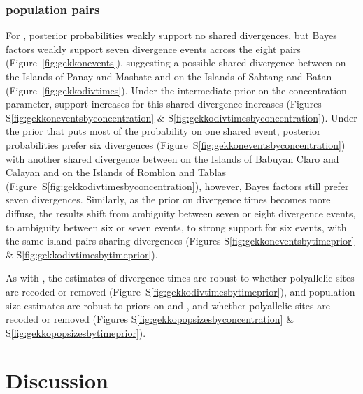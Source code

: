 \ifembed{

}{}

\ifembed{

}{}

\subsubsection{ population pairs}
For , posterior probabilities weakly support no shared divergences,
but Bayes factors weakly support seven divergence events across the eight pairs
(Figure~\ref{fig:gekkonevents}),
suggesting a possible shared divergence between
 on the Islands of Panay and Masbate
and
 on the Islands of Sabtang and Batan
(Figure~\ref{fig:gekkodivtimes}).
Under the intermediate prior on the concentration parameter, support
increases for this shared divergence increases 
(Figures
S\ref{fig:gekkoneventsbyconcentration}
\&
S\ref{fig:gekkodivtimesbyconcentration}).
Under the prior that puts most of the probability on one shared event,
posterior probabilities prefer six divergences
(Figure~S\ref{fig:gekkoneventsbyconcentration})
with another shared divergence between
 on the Islands of Babuyan Claro and Calayan
and
 on the Islands of Romblon and Tablas
(Figure~S\ref{fig:gekkodivtimesbyconcentration}), however,
Bayes factors still prefer seven divergences.
Similarly, as the prior on divergence times becomes more diffuse,
the results shift from ambiguity between seven or eight divergence
events, to ambiguity between six or seven events, to strong
support for six events, with the same island pairs sharing
divergences
(Figures
S\ref{fig:gekkoneventsbytimeprior}
\&
S\ref{fig:gekkodivtimesbytimeprior}).

\ifembed{

}{}

\ifembed{

}{}

As with , the estimates of divergence times
are robust to whether polyallelic sites are recoded or removed
(Figure~S\ref{fig:gekkodivtimesbytimeprior}),
and population size estimates are robust to 
priors on \concentration and \divtime, and whether polyallelic sites
are recoded or removed
(Figures
S\ref{fig:gekkopopsizesbyconcentration}
\&
S\ref{fig:gekkopopsizesbytimeprior}).

\section{Discussion}

